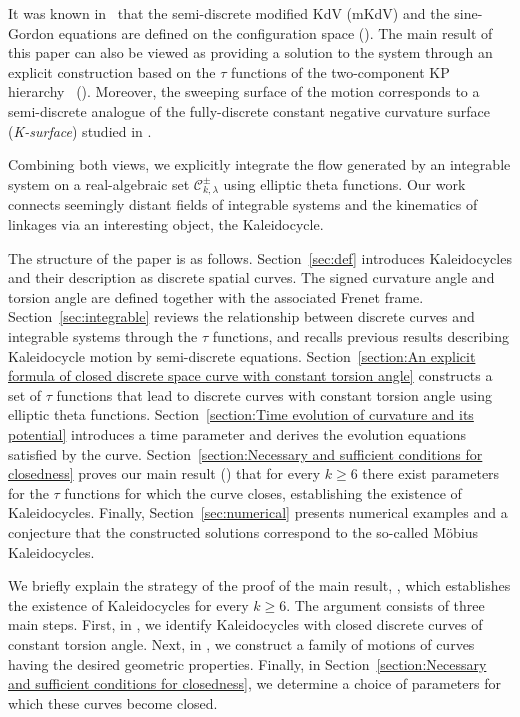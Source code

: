 \documentclass[10pt,leqno]{amsart}
\newcommand{\conf}{\mathcal{C}}
\numberwithin{equation}{section}
\begin{document}
It was known in~\cite{KKP:linkage} that 
the semi-discrete modified KdV (mKdV) and the sine-Gordon equations
are defined on the configuration space ().
The main result of this paper can also be viewed as providing a solution to the system through an explicit construction based on the $\tau$ functions of the two-component KP hierarchy~\cite{HIKMO:DLIE} (). 
Moreover, the sweeping surface of the motion 
corresponds to a semi-discrete analogue of the 
fully-discrete constant negative curvature surface
(\emph{K-surface})
studied in \cite{bobenko1996discrete,IKMO:DmKdVsG}.

Combining both views, 
we explicitly integrate the flow generated by an integrable system on a real-algebraic set $\conf^\pm_{k,\lambda}$ using elliptic theta functions.
Our work connects seemingly distant fields of integrable systems and the kinematics of linkages
via an interesting object, the Kaleidocycle.

\medskip
The structure of the paper is as follows.
Section~\ref{sec:def} introduces Kaleidocycles and their description as discrete spatial curves.
The signed curvature angle and torsion angle are defined together with the associated Frenet frame.
Section~\ref{sec:integrable} reviews the relationship between discrete curves and integrable systems through the $\tau$ functions, and recalls previous results describing Kaleidocycle motion by semi-discrete equations.
Section~\ref{section:An explicit formula of closed discrete space curve with constant torsion angle} constructs a set of $\tau$ functions that lead to discrete curves with constant torsion angle using elliptic theta functions.
Section~\ref{section:Time evolution of curvature and its potential} introduces a time parameter and derives the evolution equations satisfied by the curve.
Section~\ref{section:Necessary and sufficient conditions for closedness} proves our main result () that for every $k\ge6$ there exist parameters for the $\tau$ functions for which the curve closes, establishing the existence of Kaleidocycles.
Finally, Section~\ref{sec:numerical} presents numerical examples and a conjecture that the constructed solutions correspond to the so-called M\"obius Kaleidocycles.

We briefly explain the strategy of the proof of the main result, , which establishes the existence of Kaleidocycles for every $k\ge 6$.
The argument consists of three main steps.
First, in , we identify Kaleidocycles with closed discrete curves of constant torsion angle.
Next, in , we construct a family of motions of curves having the desired geometric properties.
Finally, in Section~\ref{section:Necessary and sufficient conditions for closedness}, we determine a choice of parameters for which these curves become closed.
\end{document}
